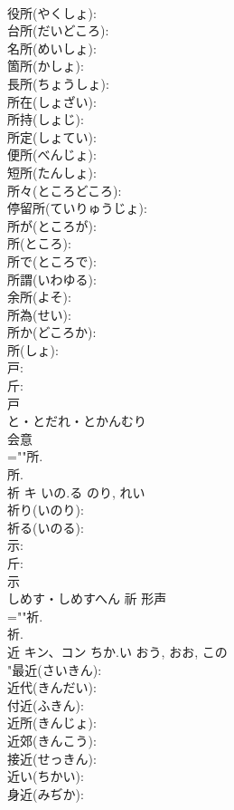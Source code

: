\documentclass[8pt]{extreport}
\begin{document}
\begin{CJK}{UTF8}{min}
\\	役所(やくしょ): 
\\	台所(だいどころ): 
\\	名所(めいしょ): 
\\	箇所(かしょ): 
\\	長所(ちょうしょ): 
\\	所在(しょざい): 
\\	所持(しょじ): 
\\	所定(しょてい): 
\\	便所(べんじょ): 
\\	短所(たんしょ): 
\\	所々(ところどころ): 
\\	停留所(ていりゅうじょ): 
\\	所が(ところが): 
\\	所(ところ): 
\\	所で(ところで): 
\\	所謂(いわゆる): 
\\	余所(よそ): 
\\	所為(せい): 
\\	所か(どころか): 
\\	所(しょ): 
\\	戸: 
\\	斤: 
\\	戸	
\\	と・とだれ・とかんむり	
\\	会意 
\\	=""所.
\\	所.
\\	祈	キ	いの.る	のり, れい	
\\	祈り(いのり): 
\\	祈る(いのる): 
\\	示: 
\\	斤: 
\\	示	
\\	しめす・しめすへん	祈	形声 
\\	=""祈.
\\	祈.
\\	近	キン、コン	ちか.い	おう, おお, この	
\\	"最近(さいきん): 
\\	近代(きんだい): 
\\	付近(ふきん): 
\\	近所(きんじょ): 
\\	近郊(きんこう): 
\\	接近(せっきん): 
\\	近い(ちかい): 
\\	身近(みぢか): 

\end{CJK}
\end{document}
